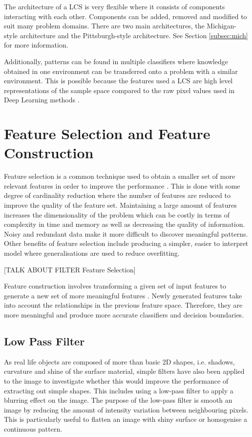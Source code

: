 The architecture of a LCS is very flexible where it consists of components interacting with each other.  Components can be added, removed and modified to suit many problem domains. There are two main architectures, the Michigan-style architecture and the Pittsburgh-style architecture. See Section \ref{subsec:mich} for more information. 

Additionally, patterns can be found in multiple classifiers where knowledge obtained in one environment can be transferred onto a problem with a similar environment. This is possible because the features used a LCS are high level representations of the sample space compared to the raw pixel values used in Deep Learning methods \cite{zang2015learning}.

\section{Feature Selection and Feature Construction}\label{subsubsec:fsfc}

Feature selection is a common technique used to obtain a smaller set of more relevant features in order to improve the performance \cite{yu2004efficient}. This is done with some degree of cardinality reduction where the number of features are reduced to improve the quality of the feature set. Maintaining a large amount of features increases the dimensionality of the problem which can be costly in terms of complexity in time and memory as well as decreasing the quality of information. Noisy and redundant data make it more difficult to discover meaningful patterns. Other benefits of feature selection include producing a simpler, easier to interpret model where generalisations are used to reduce overfitting.

[TALK ABOUT FILTER Feature Selection]

Feature construction involves transforming a given set of input features to generate a new set of more meaningful features \cite{markovitch2002feature}. Newly generated features take into account the relationships in the previous feature space. Therefore, they are more meaningful and produce more accurate classifiers and decision boundaries. 

\subsection{Low Pass Filter}
As real life objects are composed of more than basic 2D shapes, i.e. shadows, curvature and shine of the surface material, simple filters have also been applied to the image to investigate whether this would improve the performance of extracting out simple shapes. This includes using a low-pass filter to apply a blurring effect on the image. The purpose of the low-pass filter is smooth an image by reducing the amount of intensity variation between neighbouring pixels. This is particularly useful to flatten an image with shiny surface or homogenise a continuous pattern.

